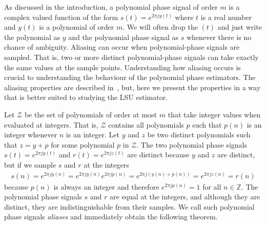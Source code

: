 \documentclass[aap]{imsart}
\newcommand{\ints}{{\mathbb Z}}
\newcommand{\term}{\emph}
\begin{document}
As discussed in the introduction, a polynomial phase signal of order $m$ is a complex valued function of the form $s(t) = e^{2\pi j y(t)}$ where $t$ is a real number and $y(t)$ is a polynomial of order $m$. We will often drop the $(t)$ and just write the polynomial as $y$ and the polynomial phase signal as $s$ whenever there is no chance of ambiguity. %
Aliasing can occur when polynomial-phase signals are sampled.  That is, two or more distinct polynomial-phase signals can take exactly the same values at the sample points.  Understanding how aliasing occurs is crucial to understanding the behaviour of the polynomial phase estimators.  The aliasing properties are described in~\cite{McKilliam2009IndentifiabliltyAliasingPolyphase}, but, here we present the properties in a way that is better suited to studying the LSU estimator.  %

Let $\mathcal{Z}$ be the set of polynomials of order at most $m$ that take integer values when evaluated at integers. That is, $\mathcal{Z}$ contains all polynomials $p$ such that $p(n)$ is an integer whenever $n$ is an integer.
Let $y$ and $z$ be two distinct polynomials such that $z = y + p$ for some polynomial $p$ in $\mathcal{Z}$. The two polynomial phase signals $s(t) = e^{2\pi j y(t)}$ and $r(t) = e^{2\pi j z(t)}$ are distinct because $y$ and $z$ are distinct, but if we sample $s$ and $r$ at the integers  
\begin{align*}
s(n) = e^{2\pi j y(n)} =  e^{2\pi j y(n)} e^{2\pi j p(n)} = e^{2\pi j (y(n) + p(n))} = e^{2\pi j z(n)} = r(n)
\end{align*}
because $p(n)$ is always an integer and therefore $e^{2\pi j p(n)} = 1$ for all $n \in \ints$. The polynomial phase signals $s$ and $r$ are equal at the integers, and although they are distinct, they are indistinguishable from their samples. We call such polynomial phase signals \term{aliases} and immediately obtain the following theorem.
\end{document}

